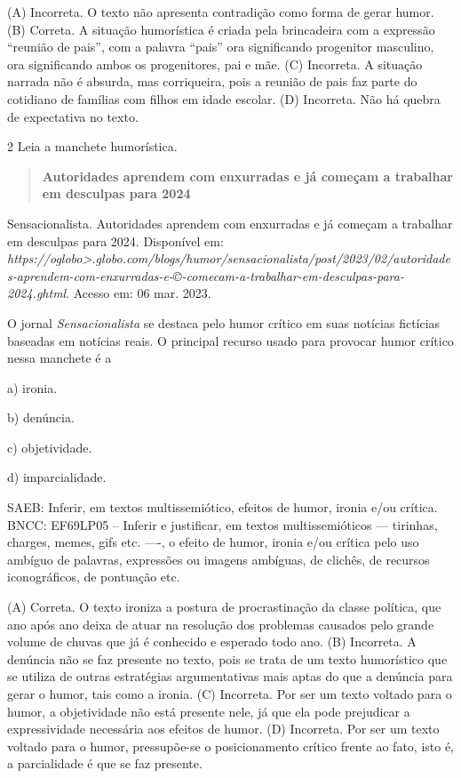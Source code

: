 (A) Incorreta. O texto não apresenta contradição como forma de gerar
humor. (B) Correta. A situação humorística é criada pela brincadeira com
a expressão ``reunião de pais'', com a palavra ``pais'' ora significando
progenitor masculino, ora significando ambos os progenitores, pai e mãe.
(C) Incorreta. A situação narrada não é absurda, mas corriqueira, pois a
reunião de pais faz parte do cotidiano de famílias com filhos em idade
escolar. (D) Incorreta. Não há quebra de expectativa no texto.

\num{2} Leia a manchete humorística.

\begin{quote}
\textbf{Autoridades aprendem com enxurradas e já começam a trabalhar em
desculpas para 2024}
\end{quote}

Sensacionalista. Autoridades aprendem com enxurradas e já começam a
trabalhar em desculpas para 2024. Disponível em:
\emph{https://oglobo\textgreater.globo.com/blogs/humor/sensacionalista/post/2023/02/autoridades-aprendem-com-enxurradas-e-©-comecam-a-trabalhar-em-desculpas-para-2024.ghtml}.
Acesso em: 06 mar. 2023.

O jornal \emph{Sensacionalista} se destaca pelo humor crítico em suas
notícias fictícias baseadas em notícias reais. O principal recurso usado
para provocar humor crítico nessa manchete é a

a) ironia.

b) denúncia.

c) objetividade.

d) imparcialidade.

SAEB: Inferir, em textos multissemiótico, efeitos de humor, ironia e/ou
crítica. BNCC: EF69LP05 -- Inferir e justificar, em textos
multissemióticos --- tirinhas, charges, memes, gifs etc. ----, o efeito
de humor, ironia e/ou crítica pelo uso ambíguo de palavras, expressões
ou imagens ambíguas, de clichês, de recursos iconográficos, de pontuação
etc.

(A) Correta. O texto ironiza a postura de procrastinação da classe
política, que ano após ano deixa de atuar na resolução dos problemas
causados pelo grande volume de chuvas que já é conhecido e esperado todo
ano. (B) Incorreta. A denúncia não se faz presente no texto, pois se
trata de um texto humorístico que se utiliza de outras estratégias
argumentativas mais aptas do que a denúncia para gerar o humor, tais
como a ironia. (C) Incorreta. Por ser um texto voltado para o humor, a
objetividade não está presente nele, já que ela pode prejudicar a
expressividade necessária aos efeitos de humor. (D) Incorreta. Por ser
um texto voltado para o humor, pressupõe-se o posicionamento crítico
frente ao fato, isto é, a parcialidade é que se faz presente.

